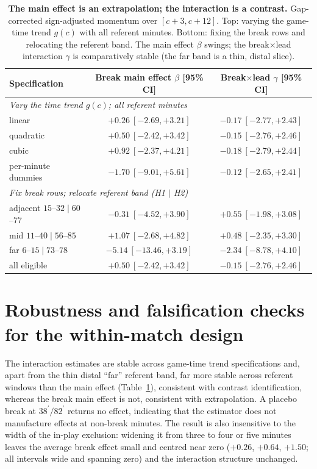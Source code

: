 \documentclass[11pt]{article}
\begin{document}
\begin{table}[h]
\centering\small
\caption{\textbf{The main effect is an extrapolation; the interaction is a contrast.} Gap-corrected
sign-adjusted momentum over $[c{+}3,c{+}12]$. Top: varying the game-time trend $g(c)$ with all referent
minutes. Bottom: fixing the break rows and relocating the referent band. The main effect $\beta$ swings; the
break$\times$lead interaction $\gamma$ is comparatively stable (the far band is a thin, distal slice).}
\label{tab:referent}
\begin{tabular}{lcc}
\toprule
Specification & Break main effect $\beta$ [95\% CI] & Break$\times$lead $\gamma$ [95\% CI] \\
\midrule
\multicolumn{3}{l}{\emph{Vary the time trend $g(c)$; all referent minutes}}\\
\quad linear                & $+0.26\ [-2.69,+3.21]$  & $-0.17\ [-2.77,+2.43]$ \\
\quad quadratic             & $+0.50\ [-2.42,+3.42]$  & $-0.15\ [-2.76,+2.46]$ \\
\quad cubic                 & $+0.92\ [-2.37,+4.21]$  & $-0.18\ [-2.79,+2.44]$ \\
\quad per-minute dummies    & $-1.70\ [-9.01,+5.61]$  & $-0.12\ [-2.65,+2.41]$ \\
\midrule
\multicolumn{3}{l}{\emph{Fix break rows; relocate referent band (H1 $\mid$ H2)}}\\
\quad adjacent $15$--$32\mid 60$--$77$ & $-0.31\ [-4.52,+3.90]$  & $+0.55\ [-1.98,+3.08]$ \\
\quad mid $11$--$40\mid 56$--$85$      & $+1.07\ [-2.68,+4.82]$  & $+0.48\ [-2.35,+3.30]$ \\
\quad far $6$--$15\mid 73$--$78$       & $-5.14\ [-13.46,+3.19]$ & $-2.34\ [-8.78,+4.10]$ \\
\quad all eligible                     & $+0.50\ [-2.42,+3.42]$  & $-0.15\ [-2.76,+2.46]$ \\
\bottomrule
\end{tabular}
\end{table}

\section{Robustness and falsification checks for the within-match design}
\label{app:robust}

The interaction estimates are stable across game-time trend specifications and, apart from the thin distal
``far'' referent band, far more stable across referent windows than the main effect (Table~\ref{tab:referent}),
consistent with contrast identification, whereas the break main effect is not, consistent with extrapolation. A placebo break at $38^\prime/82^\prime$ returns no effect, indicating that the
estimator does not manufacture effects at non-break minutes. The result is also insensitive to the width of
the in-play exclusion: widening it from three to four or five minutes leaves the average break effect small
and centred near zero ($+0.26$, $+0.64$, $+1.50$; all intervals wide and spanning zero) and the interaction
structure unchanged.



\end{document}
